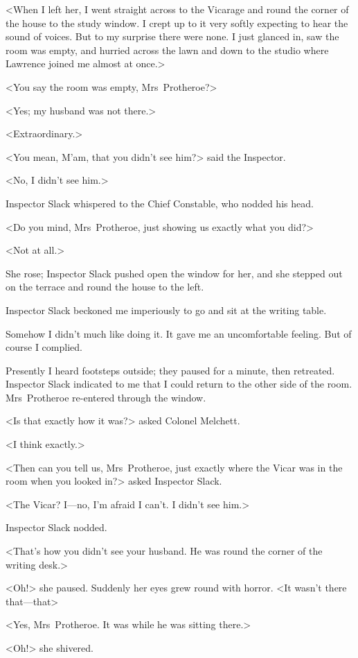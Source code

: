 <When I left her, I went straight across to the Vicarage and round the corner of the house to the study window. I crept up to it very softly expecting to hear the sound of voices. But to my surprise there were none. I just glanced in, saw the room was empty, and hurried across the lawn and down to the studio where Lawrence joined me almost at once.>

<You say the room was empty, Mrs~Protheroe?>

<Yes; my husband was not there.>

<Extraordinary.>

<You mean, M'am, that you didn't see him?> said the Inspector.

<No, I didn't see him.>

Inspector Slack whispered to the Chief Constable, who nodded his head.

<Do you mind, Mrs~Protheroe, just showing us exactly what you did?>

<Not at all.>

She rose; Inspector Slack pushed open the window for her, and she stepped out on the terrace and round the house to the left.

Inspector Slack beckoned me imperiously to go and sit at the writing table.

Somehow I didn't much like doing it. It gave me an uncomfortable feeling. But of course I complied.

Presently I heard footsteps outside; they paused for a minute, then retreated. Inspector Slack indicated to me that I could return to the other side of the room. Mrs~Protheroe re-entered through the window.

<Is that exactly how it was?> asked Colonel Melchett.

<I think exactly.>

<Then can you tell us, Mrs~Protheroe, just exactly where the Vicar was in the room when you looked in?> asked Inspector Slack.

<The Vicar? I—no, I'm afraid I can't. I didn't see him.>

Inspector Slack nodded.

<That's how you didn't see your husband. He was round the corner of the writing desk.>

<Oh!> she paused. Suddenly her eyes grew round with horror. <It wasn't there that—that\longdash>

<Yes, Mrs~Protheroe. It was while he was sitting there.>

<Oh!> she shivered.

